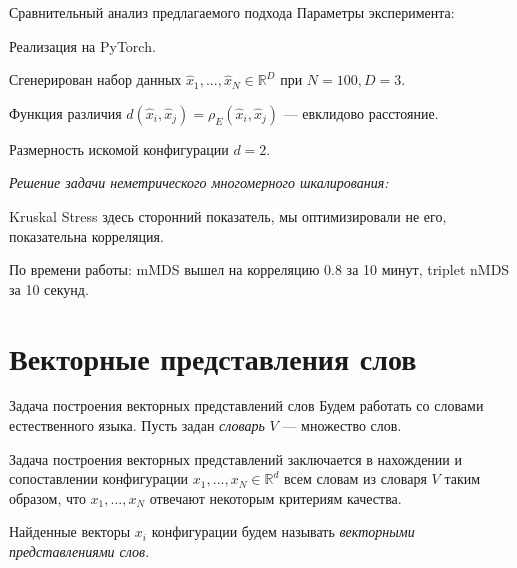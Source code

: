\documentclass[9pt]{beamer}
\newcommand{\real}{\mathbb{R}}
\begin{document}
\begin{frame}{Сравнительный анализ предлагаемого подхода}
Параметры эксперимента:

    Реализация на PyTorch.
    
    Сгенерирован набор данных $\hat{x}_1, ..., \hat{x}_N \in \real^{D}$ при $N=100, D=3$. 
    
    Функция различия $d(\hat{x}_i, \hat{x}_j) = \rho_E (\hat{x}_i, \hat{x}_j)$ --- евклидово расстояние.
    
    Размерность искомой конфигурации $d=2$.
    
    \vspace{\baselineskip} 
    \textit{Решение задачи неметрического многомерного шкалирования:}
    
    
\begin{table}[h!]
\begin{center}
\end{center}
\end{table}

Kruskal Stress здесь сторонний показатель, мы оптимизировали не его, показательна корреляция.

\vspace{\baselineskip} 
По времени работы: mMDS вышел на корреляцию 0.8 за 10 минут, triplet nMDS за 10 секунд.
\end{frame}

\section{Векторные представления слов}

\begin{frame}{Задача построения векторных представлений слов}
 Будем работать со словами естественного языка. Пусть задан \textit{словарь} $V$ --- множество слов. 
 \vspace{\baselineskip} 
 
 Задача построения векторных представлений заключается в нахождении и сопоставлении конфигурации $x_1, ..., x_N \in \mathbb{R}^d$ всем словам из словаря $V$ таким образом, что $x_1, ..., x_N$ отвечают некоторым критериям качества. 
 \vspace{\baselineskip} 
 
 Найденные векторы $x_i$ конфигурации будем называть \textit{векторными представлениями слов}.   
\end{frame}
\end{document}
